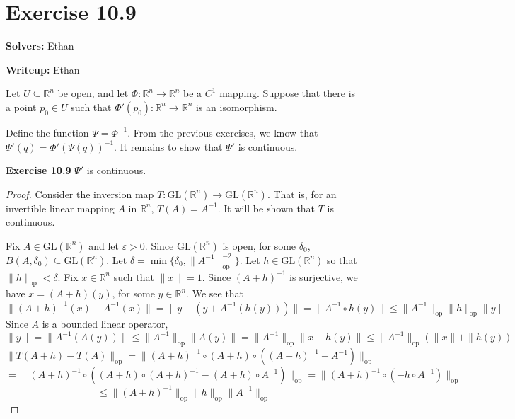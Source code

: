 \documentclass{article}
\newcommand{\op}{\mathrm{op}}
\newcommand{\GL}{\mathrm{GL}}
\theoremstyle{plain} %
\numberwithin{thm}{section} %
\theoremstyle{definition}
\begin{document}
    \section*{Exercise 10.9}
    \textbf{Solvers:} Ethan

    \noindent\textbf{Writeup:} Ethan

    Let \(U \subseteq \mathbb{R}^n\) be open, and let \(\Phi : \mathbb{R}^n \to \mathbb{R}^n\) be a \(C^1\) mapping. Suppose that there is a point \(p_0 \in U\) such that \(\Phi '(p_0) : \mathbb{R}^n \to \mathbb{R}^n\) is an isomorphism.

    \medskip

    Define the function \(\Psi = \Phi ^{-1}\). From the previous exercises, we know that \(\Psi '(q) = \Phi '(\Psi (q)) ^{-1}\). It remains to show that \(\Psi '\) is continuous.

    \noindent\textbf{Exercise 10.9} \(\Psi '\) is continuous.

    \begin{proof}
        Consider the inversion map \(T : \GL(\mathbb{R}^n) \to \GL(\mathbb{R}^n)\). That is, for an invertible linear mapping \(A\) in \(\mathbb{R}^n\), \(T(A) = A^{-1}\). It will be shown that \(T\) is continuous.

        Fix \(A \in \GL(\mathbb{R}^n)\) and let \(\varepsilon > 0\). Since \(\GL(\mathbb{R}^n)\) is open, for some \(\delta _0\), \(B(A, \delta _0) \subseteq \GL(\mathbb{R}^n)\). Let \(\delta = \min \{\delta _0, \|A^{-1}\| _{\op}^{-2}\}\). Let \(h \in \GL(\mathbb{R}^n)\) so that \(\|h\| _{\op} < \delta\). Fix \(x \in \mathbb{R}^n\) such that \(\|x\| = 1\). Since \((A + h)^{-1}\) is surjective, we have \(x = (A+h) (y)\), for some \(y \in \mathbb{R}^n\). We see that
        \[
            \|(A + h)^{-1} (x) - A^{-1} (x)\| = \|y - (y + A^{-1}(h(y)))\| = \|A^{-1} \circ h (y)\| \leq \|A^{-1}\| _{\op} \|h\| _{\op} \|y\|
        \]
        Since \(A\) is a bounded linear operator,
        \[
            \|y\| = \|A^{-1}(A (y))\| \leq \|A^{-1}\| _{\op} \|A(y)\| = \|A^{-1}\| _{\op} \|x - h(y)\| \leq \|A^{-1}\| _{\op} \left( \|x\| + \|h(y) \right)
        \]
        \[
            \|T(A + h) - T(A)\|_{\op} = \|(A+h)^{-1} \circ (A+h) \circ ((A+h)^{-1} - A^{-1})\|_{\op}
        \]
        \[
            = \|(A+h)^{-1} \circ ((A+h)\circ (A+h)^{-1} - (A+h) \circ A^{-1})\|_{\op} = \|(A+h)^{-1} \circ (- h \circ A^{-1})\|_{\op}
        \]
        \[
            \leq \|(A+h)^{-1}\|_{\op} \|h\|_{\op} \|A^{-1}\|_{\op}
        \]
    \end{proof}
\end{document}
